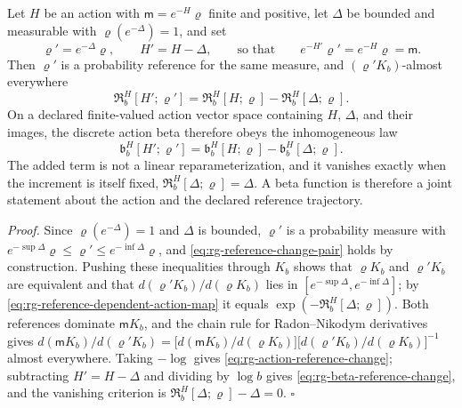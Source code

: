 Let \(H\) be an action with \(\mathsf m=e^{-H}\varrho\) finite and positive, let
\(\Delta\) be bounded and measurable with \(\varrho(e^{-\Delta})=1\), and set
\begin{equation}
\varrho'=e^{-\Delta}\varrho,
\qquad
H'=H-\Delta,
\qquad\text{so that}\qquad
e^{-H'}\varrho'=e^{-H}\varrho=\mathsf m.
\label{eq:rg-reference-change-pair}
\end{equation}
Then \(\varrho'\) is a probability reference for the same measure, and
\((\varrho'K_b)\)-almost everywhere
\begin{equation}
\mathfrak R^H_b[H';\varrho']
=\mathfrak R^H_b[H;\varrho]-\mathfrak R^H_b[\Delta;\varrho].
\label{eq:rg-action-reference-change}
\end{equation}
On a declared finite-valued action vector space containing \(H\), \(\Delta\),
and their images, the discrete action beta therefore obeys the inhomogeneous
law
\begin{equation}
\mathfrak b^H_b[H';\varrho']
=\mathfrak b^H_b[H;\varrho]-\mathfrak b^H_b[\Delta;\varrho].
\label{eq:rg-beta-reference-change}
\end{equation}
The added term is not a linear reparameterization, and it vanishes exactly
when the increment is itself fixed, \(\mathfrak R^H_b[\Delta;\varrho]=\Delta\). A
beta function is therefore a joint statement about the action and the
declared reference trajectory. 

\noindent\emph{Proof.}
Since \(\varrho(e^{-\Delta})=1\) and \(\Delta\) is bounded, \(\varrho'\) is a
probability measure with
\(e^{-\sup\Delta}\varrho\leq\varrho'\leq e^{-\inf\Delta}\varrho\), and
\eqref{eq:rg-reference-change-pair} holds by construction. Pushing these
inequalities through \(K_b\) shows that \(\varrho K_b\) and \(\varrho'K_b\) are
equivalent and that \(d(\varrho'K_b)/d(\varrho K_b)\) lies in
\([e^{-\sup\Delta},e^{-\inf\Delta}]\); by
\eqref{eq:rg-reference-dependent-action-map} it equals
\(\exp(-\mathfrak R^H_b[\Delta;\varrho])\). Both references dominate \(\mathsf mK_b\), and
the chain rule for Radon--Nikodym derivatives gives
\(d(\mathsf mK_b)/d(\varrho'K_b)=\bigl[d(\mathsf mK_b)/d(\varrho K_b)\bigr]
\bigl[d(\varrho'K_b)/d(\varrho K_b)\bigr]^{-1}\) almost everywhere. Taking \(-\log\)
gives \eqref{eq:rg-action-reference-change}; subtracting \(H'=H-\Delta\) and
dividing by \(\log b\) gives \eqref{eq:rg-beta-reference-change}, and the
vanishing criterion is \(\mathfrak R^H_b[\Delta;\varrho]-\Delta=0\). \(\square\)

